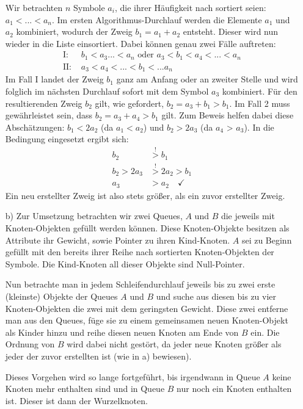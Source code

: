 \documentclass{article}
\begin{document}
\begin{enumerate}
        Wir betrachten $n$ Symbole $a_i$, die ihrer Häufigkeit nach sortiert seien: $a_1 < ... < a_n$. Im ersten Algorithmus-Durchlauf werden die Elemente $a_1$ und $a_2$ kombiniert, wodurch der Zweig $b_1 = a_1 + a_2$ entsteht. Dieser wird nun wieder in die Liste einsortiert. Dabei können genau zwei Fälle auftreten:
        \begin{align*}
            \text{I: } &b_1 < a_3 ... < a_n \text{ oder } a_3 < b_1 < a_4 < ... < a_n \\
            \text{II: } &a_3 < a_4 < ... < b_1 < ... a_n 
        \end{align*}
        Im Fall I landet der Zweig $b_1$ ganz am Anfang oder an zweiter Stelle und wird folglich im nächsten Durchlauf sofort mit dem Symbol $a_3$ kombiniert. Für den resultierenden Zweig $b_2$ gilt, wie gefordert, $b_2 = a_3 + b_1 > b_1$.
        Im Fall 2 muss gewährleistet sein, dass $b_2 = a_3 + a_4 > b_1$ gilt. Zum Beweis helfen dabei diese Abschätzungen: $b_1 < 2a_2$ (da $a_1 < a_2$) und $b_2 > 2a_3$ (da $a_4$ > $a_3$). In die Bedingung eingesetzt ergibt sich:
        \begin{align*}
            b_2 &\stackrel{!}{>} b_1 \\
            b_2 > 2a_3 &\stackrel{!}{>} 2a_2 > b_1 \\
            a_3 &> a_2 \quad \checkmark
        \end{align*}
        Ein neu erstellter Zweig ist also stets größer, als ein zuvor erstellter Zweig. 
        \item[b)]
        Zur Umsetzung betrachten wir zwei Queues, $A$ und $B$ die jeweils mit Knoten-Objekten gefüllt werden können. Diese Knoten-Objekte besitzen als Attribute ihr Gewicht, sowie Pointer zu ihren Kind-Knoten. $A$ sei zu Beginn gefüllt mit den bereits ihrer Reihe nach sortierten Knoten-Objekten der Symbole. Die Kind-Knoten all dieser Objekte sind Null-Pointer.

        Nun betrachte man in jedem Schleifendurchlauf jeweils bis zu zwei erste (kleinste) Objekte der Queues $A$ und $B$ und suche aus diesen bis zu vier Knoten-Objekten die zwei mit dem geringsten Gewicht. Diese zwei entferne man aus den Queues, füge sie zu einem gemeinsamen neuen Knoten-Objekt als Kinder hinzu und reihe diesen neuen Knoten am Ende von $B$ ein. Die Ordnung von $B$ wird dabei nicht gestört, da jeder neue Knoten größer als jeder der zuvor erstellten ist (wie in a) bewiesen). 

        Dieses Vorgehen wird so lange fortgeführt, bis irgendwann in Queue $A$ keine Knoten mehr enthalten sind und in Queue $B$ nur noch ein Knoten enthalten ist. Dieser ist dann der Wurzelknoten. 
    \end{enumerate}
\end{document}
